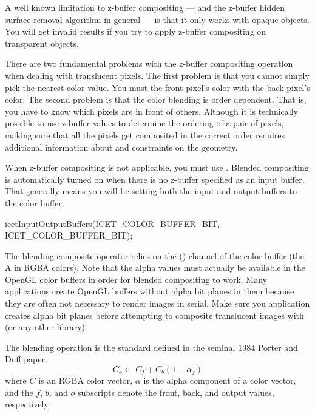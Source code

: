 A well known limitation to z-buffer compositing --- and the z-buffer hidden
surface removal algorithm in general --- is that it only works with opaque
objects.  You will get invalid results if you try to apply z-buffer
compositing on transparent objects.

There are two fundamental problems with the z-buffer compositing operation
when dealing with translucent pixels.  The first problem is that you cannot
simply pick the nearest color value.  You must  the front
pixel's color with the back pixel's color.  The second problem is that the
color blending is order dependent.  That is, you have to know which pixels
are in front of others.  Although it is technically possible to use
z-buffer values to determine the ordering of a pair of pixels, making sure
that all the pixels get composited in the correct order requires additional
information about and constraints on the geometry.

When z-buffer compositing is not applicable, you must use .  Blended compositing is automatically turned on when there
is no z-buffer specified as an input buffer.  That generally means you will
be setting both the input and output buffers to the color buffer.
\begin{code}
  icetInputOutputBuffers(ICET_COLOR_BUFFER_BIT, ICET_COLOR_BUFFER_BIT);
\end{code}

The blending composite operator relies on the 
(\index{$\alpha$}\keyterm{$\alpha$}) channel of the color buffer (the A in
RGBA colors).  Note that the alpha values must actually be available in the
OpenGL color buffers in order for blended compositing to work.  Many
applications create OpenGL buffers without alpha bit planes in them because
they are often not necessary to render images in serial.  Make sure you
application creates alpha bit planes before attempting to composite
translucent images with \IceT (or any other library).

The blending operation is the standard
defined in the seminal 1984 Porter and Duff paper.
\begin{equation}
  C_o \leftarrow C_f + C_b (1 - \alpha_f)
  \label{eq:VolumeRendering:OverOperator}
\end{equation}
where $C$ is an RGBA color vector, $\alpha$ is the alpha component of a
color vector, and the $f$, $b$, and $o$ subscripts denote the front, back,
and output values, respectively.

